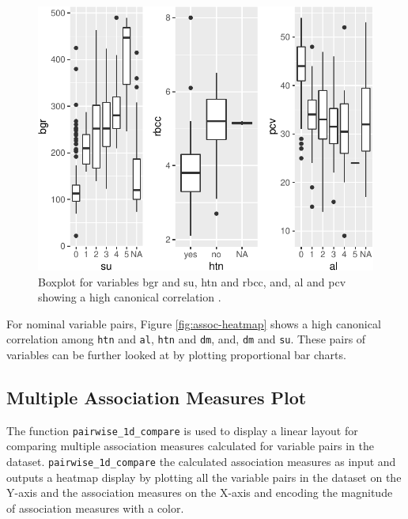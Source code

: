 \begin{Schunk}
\begin{figure}

{\centering \includegraphics{rj_paper_files/figure-latex/mixed-pairs-1} 

}

\caption[Boxplot for variables bgr and su, htn and rbcc, and, al and pcv showing a high canonical correlation ]{Boxplot for variables bgr and su, htn and rbcc, and, al and pcv showing a high canonical correlation . }\label{fig:mixed-pairs}
\end{figure}
\end{Schunk}

For nominal variable pairs, Figure \ref{fig:assoc-heatmap} shows a high
canonical correlation among \texttt{htn} and \texttt{al}, \texttt{htn}
and \texttt{dm}, and, \texttt{dm} and \texttt{su}. These pairs of
variables can be further looked at by plotting proportional bar charts.

\hypertarget{multiple-association-measures-plot}{%
\subsection{Multiple Association Measures
Plot}\label{multiple-association-measures-plot}}

The function \texttt{pairwise\_1d\_compare} is used to display a linear
layout for comparing multiple association measures calculated for
variable pairs in the dataset. \texttt{pairwise\_1d\_compare} the
calculated association measures as input and outputs a heatmap display
by plotting all the variable pairs in the dataset on the Y-axis and the
association measures on the X-axis and encoding the magnitude of
association measures with a color.

